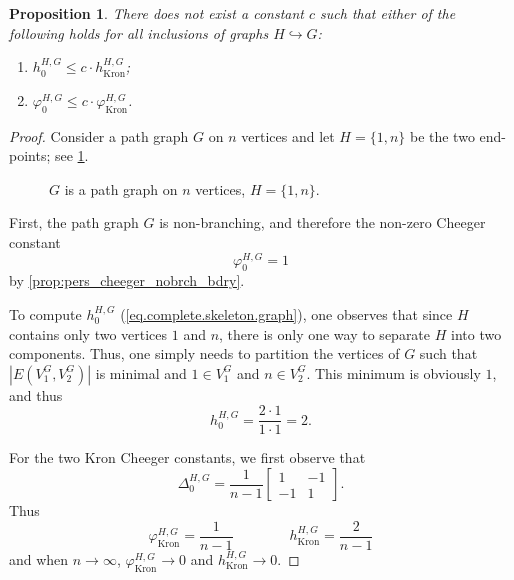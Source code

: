 \documentclass{article}
\newtheorem{proposition}{Proposition}[section]
\begin{document}
\begin{proposition}
There does not exist a constant $c$ such that either of the following holds for all inclusions of graphs $H\hookrightarrow G$:
\begin{enumerate}
    \item $h_{0}^{H, G}  \leq c \cdot h_{\operatorname{Kron}}^{H, G}$;
    \item $\varphi_0^{H, G}\leq c\cdot \varphi_{\operatorname{Kron}}^{H, G}$.
\end{enumerate}
    \label{ex:cheeger_equiv}
\end{proposition}
\begin{proof}
Consider a path graph $G$ on $n$ vertices and let $H=\{1, n\}$ be the two end-points; see \cref{fig:path_graph}.
\begin{figure}[H]
\centering
{}
\caption{$G$ is a path graph on $n$ vertices, $H=\{1, n\}$.}
\label{fig:path_graph}
\end{figure}


First, the path graph $G$ is non-branching, and therefore the non-zero Cheeger constant 
\[\varphi_{0}^{H, G}=1\] by \cref{prop:pers_cheeger_nobrch_bdry}.


To compute $h_0^{H, G}$ (\cref{eq.complete.skeleton.graph}), one observes that since $H$ contains only two vertices $1$ and $n$, there is only one way to separate $H$ into two components. Thus, one simply needs
to partition the vertices of $G$ such that $|E(V_1^G, V_2^G)|$ is minimal and $1\in V_1^G$ and $n\in V_2^G$. This minimum is obviously $1$, and thus \[h_0^{H, G}=\frac{2\cdot 1}{1\cdot 1}=2.\]

For the two Kron Cheeger constants, we first observe that 
\[\Delta_0^{H, G}=\frac{1}{n-1}\begin{bmatrix}
    1 & -1\\
    -1 & 1
\end{bmatrix}.\]
Thus 
\[\varphi_{\operatorname{Kron}}^{H, G}=\frac{1}{n-1} \qquad \qquad h_{\operatorname{Kron}}^{H, G}=\frac{2}{n-1}\]
and when $n\to \infty$,
$\varphi_{\operatorname{Kron}}^{H, G}\to 0$ and $h_{\operatorname{Kron}}^{H, G}\to 0$.

\end{proof}
\end{document}
